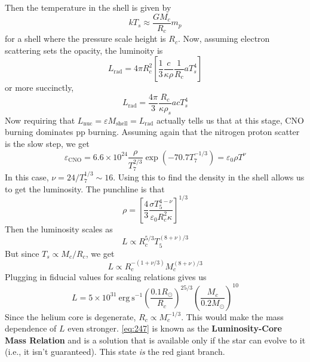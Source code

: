 \documentclass[10pt]{article}
\numberwithin{equation}{section}
\newcommand{\n}{\noindent}
\begin{document}
    \n Then the temperature in the shell is given by
    \begin{equation}
      \label{eq:240}
      kT_s\approx \frac{GM_c}{R_c}m_p
    \end{equation}
    for a shell where the pressure scale height is $R_c$. Now,
    assuming electron scattering sets the opacity, the luminoity is
    \begin{equation}
      \label{eq:241}
      L_{\mathrm{rad}}=4\pi R_c^2\left[\frac{1}{3}\frac{c}{\kappa\rho}\frac
{1}{R_c}aT_s^4\right]
    \end{equation}
    or more succinctly,
    \begin{equation}
      \label{eq:242}
      \boxed{L_{\mathrm{rad}}=\frac{4\pi}{3}\frac{R_c}{\kappa\rho_s}
acT_s^4}
    \end{equation}
    Now requiring that $L_{\mathrm{nuc}}=\varepsilon
    M_{\mathrm{shell}}=L_{\mathrm{rad}}$ actually tells us that at
    this stage, CNO burning dominates pp burning. Assuming again that
    the nitrogen proton scatter is the slow step, we get
    \begin{equation}
      \label{eq:243}
      \varepsilon_{\mathrm{CNO}}=6.6\times
      10^{24}\frac{\rho}{T_7^{2/3}}\exp\left(-70.7
        T_7^{-1/3}\right)=\varepsilon_0\rho T^\nu
    \end{equation}
    In this case, $\nu=24/T_7^{1/3}\sim 16$. Using this to find the
    density in the shell allows us to get the luminosity. The
    punchline is that 
    \begin{equation}
      \label{eq:244}
      \rho=\left[\frac{4}{3}\frac{\sigma T_5^{4-\nu}}
{\varepsilon_0R_c^2\kappa}\right]^{1/3}
    \end{equation}
    Then the luminosity scales as
    \begin{equation}
      \label{eq:245}
      L\propto R_c^{5/3}T_5^{(8+\nu)/3}
    \end{equation}
    But since $T_s\propto M_c/R_c$, we get
    \begin{equation}
      \label{eq:246}
      L\propto R_c^{-(1+\nu/3)}M_c^{(8+\nu)/3}
    \end{equation}
    Plugging in fiducial values for scaling relations gives us
    \begin{equation}
      \label{eq:247}
      L=5\times 10^{31}\ \mathrm{erg\ s^{-1}}\left(\frac{0.1R_\odot}{R_c}
\right)^{25/3}\left(\frac{M_c}{0.2M_\odot}\right)^{10}
    \end{equation}
    Since the helium core is degenerate, $R_c\propto M_c^{-1/3}$. This
    would make the mass dependence of $L$ even stronger. 
    \eqref{eq:247} is known as the \textbf{Luminosity-Core Mass Relation} and is
    a solution that is available only if the star can evolve to it (i.e., it
    isn't guaranteed). This state \emph{is} the red giant branch.\\
\end{document}
